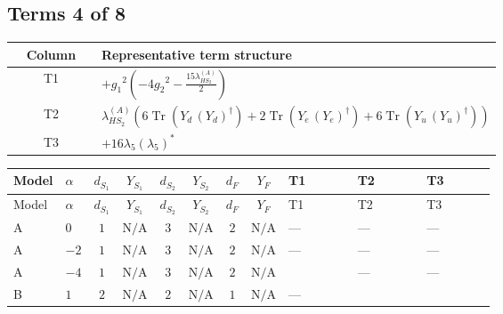 \documentclass[8pt]{article}
\begin{document}
\begin{landscape}
\subsection*{Terms 4 of 8}
\begin{center}
\begin{tabular}{@{}c >{\raggedright\arraybackslash}p{0.82\linewidth}@{}}
\toprule
Column & Representative term structure \\
\midrule
T1 & \(\displaystyle +{g_1}^2 \left(-4 {g_2}^2-\frac{15 {\lambda_{HS_2}^{(A)}}}{2}\right)\) \\
\midrule
T2 & \(\displaystyle {\lambda_{HS_2}^{(A)}} (6 \operatorname{Tr}\!\left({Y_d}\,\left({Y_d}\right)^{\dagger}\right)+2 \operatorname{Tr}\!\left({Y_e}\,\left({Y_e}\right)^{\dagger}\right)+6 \operatorname{Tr}\!\left({Y_u}\,\left({Y_u}\right)^{\dagger}\right))\) \\
\midrule
T3 & \(\displaystyle +16 {\lambda_5} \left({\lambda_5}\right)^{*}\) \\
\midrule
\bottomrule
\end{tabular}
\end{center}
\smallskip
\tiny
\begin{longtable}{@{}llcccccc >{\raggedright\arraybackslash}p{0.21\linewidth} >{\raggedright\arraybackslash}p{0.21\linewidth} >{\raggedright\arraybackslash}p{0.21\linewidth}@{}}
\toprule
Model & $\alpha$ & $d_{S_1}$ & $Y_{S_1}$ & $d_{S_2}$ & $Y_{S_2}$ & $d_F$ & $Y_F$ & T1 & T2 & T3 \\
\midrule
\endfirsthead
\toprule
Model & $\alpha$ & $d_{S_1}$ & $Y_{S_1}$ & $d_{S_2}$ & $Y_{S_2}$ & $d_F$ & $Y_F$ & T1 & T2 & T3 \\
\midrule
\endhead
A & $0$ & $1$ & $\text{N/A}$ & $3$ & $\text{N/A}$ & $2$ & $\text{N/A}$ & --- & --- & --- \\
\midrule
A & $-2$ & $1$ & $\text{N/A}$ & $3$ & $\text{N/A}$ & $2$ & $\text{N/A}$ & --- & --- & --- \\
\midrule
A & $-4$ & $1$ & $\text{N/A}$ & $3$ & $\text{N/A}$ & $2$ & $\text{N/A}$ & \scriptsize\adjustbox{max width=\linewidth}{$\begin{gathered} +{g_1}^2 \left(-4 {g_2}^2-\frac{15 {\lambda_{HS_2}^{(A)}}}{2}\right)\end{gathered}$} & --- & --- \\
\midrule
B & $1$ & $2$ & $\text{N/A}$ & $2$ & $\text{N/A}$ & $1$ & $\text{N/A}$ & --- & \scriptsize\adjustbox{max width=\linewidth}{$\begin{gathered} {\lambda_{HS_2}^{(A)}} (6 \operatorname{Tr}\!\left({Y_d}\,\left({Y_d}\right)^{\dagger}\right)+2 \operatorname{Tr}\!\left({Y_e}\,\left({Y_e}\right)^{\dagger}\right)+6 \operatorname{Tr}\!\left({Y_u}\,\left({Y_u}\right)^{\dagger}\right))\end{gathered}$} & \scriptsize\adjustbox{max width=\linewidth}{$\begin{gathered} +16 {\lambda_5} \left({\lambda_5}\right)^{*}\end{gathered}$} \\

\end{longtable}
\end{landscape}
\end{document}
